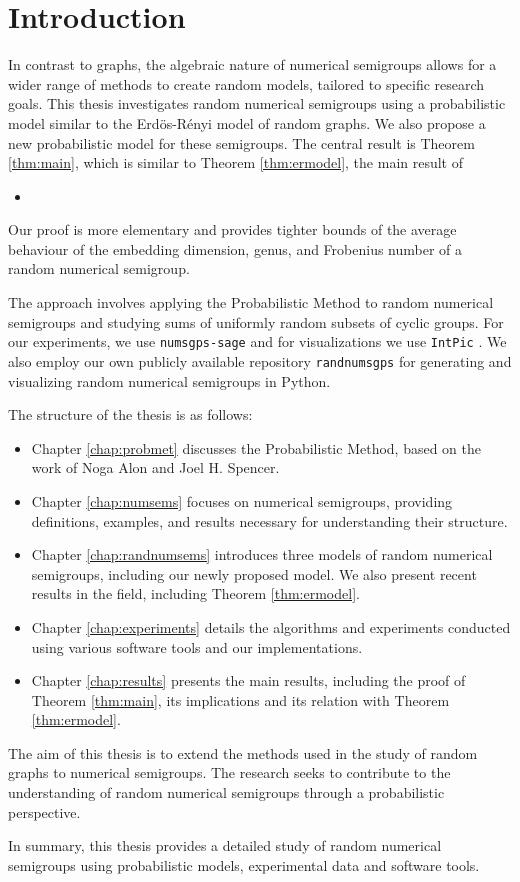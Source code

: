 \chapter{Introduction}\label{chap:intro}


In contrast to graphs, the algebraic nature of numerical semigroups allows for a wider range of methods to create random models, tailored to specific research goals. This thesis investigates random numerical semigroups using a probabilistic model similar to the Erdös-Rényi model of random graphs. We also propose a new probabilistic model for these semigroups. The central result is Theorem \ref{thm:main}, which is similar to Theorem \ref{thm:ermodel}, the main result of 
\begin{itemize}
    \item {}
\end{itemize}
Our proof is more elementary and provides tighter bounds of the average behaviour of the embedding dimension, genus, and Frobenius number of a random numerical semigroup. 

The approach involves applying the Probabilistic Method to random numerical semigroups and studying sums of uniformly random subsets of cyclic groups. For our experiments, we use \verb|numsgps-sage| \cite[O'Neill]{oneill2018}\cite[Delgado]{delgado2015numericalsgps} and for visualizations we use \verb|IntPic| \cite[Delgado]{delgado2013intpic}. We also employ our own publicly available repository \verb|randnumsgps| \cite{morales2023} for generating and visualizing random numerical semigroups in Python.

The structure of the thesis is as follows:

\begin{itemize}
    \item Chapter \ref{chap:probmet} discusses the Probabilistic Method, based on the work of Noga Alon and Joel H. Spencer.
    \item Chapter \ref{chap:numsems} focuses on numerical semigroups, providing definitions, examples, and results necessary for understanding their structure.
    \item Chapter \ref{chap:randnumsems} introduces three models of random numerical semigroups, including our newly proposed model. We also present recent results in the field, including Theorem \ref{thm:ermodel}. 
    \item Chapter \ref{chap:experiments} details the algorithms and experiments conducted using various software tools and our implementations.
    \item Chapter \ref{chap:results} presents the main results, including the proof of Theorem \ref{thm:main}, its implications and its relation with Theorem \ref{thm:ermodel}.
\end{itemize}

The aim of this thesis is to extend the methods used in the study of random graphs to numerical semigroups. The research seeks to contribute to the understanding of random numerical semigroups through a probabilistic perspective.

In summary, this thesis provides a detailed study of random numerical semigroups using probabilistic models, experimental data and software tools.